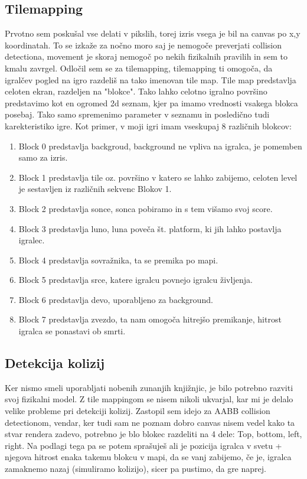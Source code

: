 \documentclass[a4paper,11pt]{article}
\begin{document}
\subsection{Tilemapping}

Prvotno sem poskušal vse delati v pikslih, torej izris vsega je bil na canvas po x,y koordinatah. To se izkaže za nočno moro saj je nemogoče preverjati collision detectiona, movement je skoraj nemogoč po nekih fizikalnih pravilih in sem to kmalu zavrgel. 
Odločil sem se za tilemapping, tilemapping ti omogoča, da igralčev pogled na igro razdeliš na tako imenovan tile map. Tile map predstavlja celoten ekran, razdeljen na "blokce". Tako lahko celotno igralno površino predstavimo kot en ogromed 2d seznam, kjer pa imamo vrednosti vsakega blokca posebaj. Tako samo spremenimo parameter v seznamu in posledično tudi karekteristiko igre. Kot primer, v moji igri imam vseskupaj 8 različnih blokcov:
\begin{enumerate}
	\item Block 0 predstavlja backgroud, background ne vpliva na igralca, je pomemben samo za izris.
	\item Block 1 predstavlja tile oz. površino v katero se lahko zabijemo, celoten level je sestavljen iz
	različnih sekvenc Blokov 1.
	\item Block 2 predstavlja sonce, sonca pobiramo in s tem višamo svoj score.
	\item Block 3 predstavlja luno, luna poveča št. platform, ki jih lahko postavlja igralec.
	\item Block 4 predstavlja sovražnika, ta se premika po mapi.
	\item Block 5 predstavlja srce, katere igralcu povnejo igralcu življenja.
	\item Block 6 predstavlja devo, uporabljeno za background.
	\item Block 7 predstavlja zvezdo, ta nam omogoča hitrejšo premikanje, hitrost igralca se ponastavi ob smrti.
\end{enumerate}
\pagebreak
\subsection{Detekcija kolizij}

Ker nismo smeli uporabljati nobenih zunanjih knjižnjic, je bilo potrebno razviti svoj fizikalni model. Z tile mappingom se nisem nikoli ukvarjal, kar mi je delalo velike probleme pri detekciji kolizij. Zastopil sem idejo za AABB collision detectionom, vendar, ker tudi sam ne poznam dobro canvas nisem vedel kako ta stvar rendera zadevo, potrebno je blo blokec razdeliti na 4 dele: Top, bottom, left, right. Na podlagi tega pa se potem sprašuješ ali je pozicija igralca v svetu + njegova hitrost enaka takemu blokcu v mapi, da se vanj zabijemo, če je, igralca zamaknemo nazaj (simuliramo kolizijo), sicer pa pustimo, da gre naprej.
\end{document}
